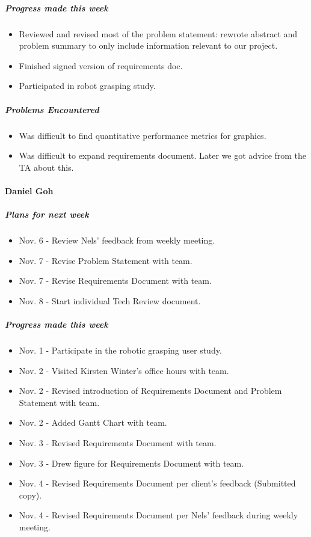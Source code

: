 {\subparagraph{Progress made this week}
\begin{itemize}
  \item Reviewed and revised most of the problem statement: rewrote abstract and problem summary to only include information relevant to our project.
  \item Finished signed version of requirements doc.
  \item Participated in robot grasping study.
\end{itemize}

\subparagraph{Problems Encountered}
\begin{itemize}
  \item Was difficult to find quantitative performance metrics for graphics.
  \item Was difficult to expand requirements document. Later we got advice from the TA about this.
\end{itemize}

\vspace{3mm}

\paragraph{Daniel Goh}
\subparagraph{Plans for next week}
\begin{itemize}
  \item Nov. 6 - Review Nels' feedback from weekly meeting.
  \item Nov. 7 - Revise Problem Statement with team.
  \item Nov. 7 - Revise Requirements Document with team.
  \item Nov. 8 - Start individual Tech Review document.
\end{itemize}

\subparagraph{Progress made this week}
\begin{itemize}
  \item Nov. 1 - Participate in the robotic grasping user study.
  \item Nov. 2 - Visited Kirsten Winter's office hours with team.
  \item Nov. 2 - Revised introduction of Requirements Document and Problem Statement with team.
  \item Nov. 2 - Added Gantt Chart with team.
  \item Nov. 3 - Revised Requirements Document with team.
  \item Nov. 3 - Drew figure for Requirements Document with team.
  \item Nov. 4 - Revised Requirements Document per client's feedback (Submitted copy).
  \item Nov. 4 - Revised Requirements Document per Nels' feedback during weekly meeting.
\end{itemize}

}

